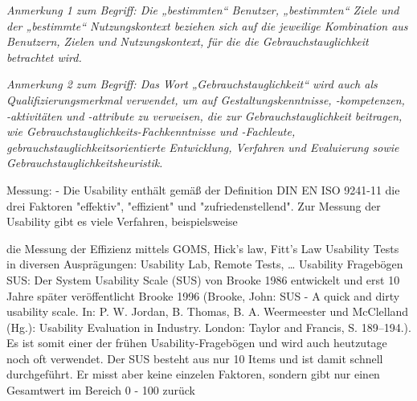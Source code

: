 \textit{Anmerkung 1 zum Begriff: Die „bestimmten“ Benutzer, „bestimmten“ Ziele und der „bestimmte“ Nutzungskontext beziehen sich auf die jeweilige Kombination aus Benutzern, Zielen und Nutzungskontext, für die die Gebrauchstauglichkeit betrachtet wird.}

\textit{Anmerkung 2 zum Begriff: Das Wort „Gebrauchstauglichkeit“ wird auch als Qualifizierungsmerkmal verwendet, um auf Gestaltungskenntnisse, -kompetenzen, -aktivitäten und -attribute zu verweisen, die zur Gebrauchstauglichkeit beitragen, wie Gebrauchstauglichkeits-Fachkenntnisse und -Fachleute, gebrauchstauglichkeitsorientierte Entwicklung, Verfahren und Evaluierung sowie Gebrauchstauglichkeitsheuristik.}

Messung: 
- Die Usability enthält gemäß der Definition DIN EN ISO 9241-11 die drei Faktoren "effektiv", "effizient" und "zufriedenstellend". Zur Messung der Usability gibt es viele Verfahren, beispielsweise

    die Messung der Effizienz mittels GOMS, Hick's law, Fitt's Law
    Usability Tests in diversen Ausprägungen: Usability Lab, Remote Tests, …
    Usability Fragebögen
SUS:
Der System Usability Scale (SUS) von Brooke 1986 entwickelt und erst 10 Jahre später veröffentlicht Brooke 1996 (Brooke, John: SUS - A quick and dirty usability scale. In: P. W. Jordan, B. Thomas, B. A. Weermeester und McClelland (Hg.): Usability Evaluation in Industry. London: Taylor and Francis, S. 189–194.). Es ist somit einer der frühen Usability-Fragebögen und wird auch heutzutage noch oft verwendet. Der SUS besteht aus nur 10 Items und ist damit schnell durchgeführt. Er misst aber keine einzelen Faktoren, sondern gibt nur einen Gesamtwert im Bereich 0 - 100 zurück    

